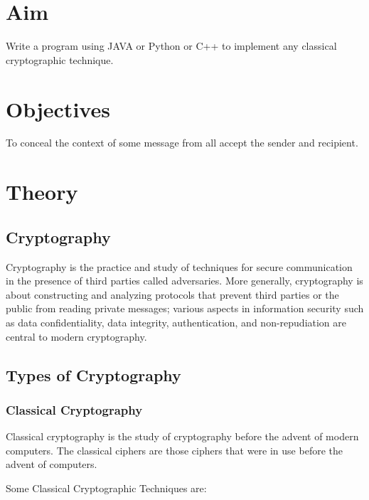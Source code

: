 \documentclass[11pt]{article}
\begin{document}
\tableofcontents
\thispagestyle{empty}
\clearpage

\setcounter{page}{1}

\section{Aim}
Write a program using JAVA or Python or C++ to implement any classical cryptographic
technique.

\section{Objectives}
To conceal the context of some message from all accept the sender and recipient.

\section{Theory}

\subsection{Cryptography}

Cryptography is the practice and study of techniques for secure communication in the presence of third parties called adversaries. More generally, cryptography is about constructing and analyzing protocols that prevent third parties or the public from reading private messages; various aspects in information security such as data confidentiality, data integrity, authentication, and non-repudiation are central to modern cryptography. \\

\subsection{Types of Cryptography}

\subsubsection{Classical Cryptography}

Classical cryptography is the study of cryptography before the advent of modern computers. The classical ciphers are those ciphers that were in use before the advent of computers.

Some Classical Cryptographic Techniques are:
\end{document}
